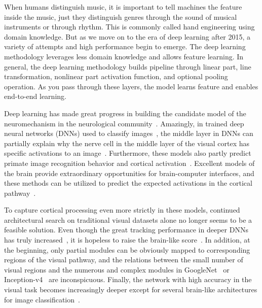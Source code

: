 \documentclass[final,3p,times,twocolumn]{elsarticle}
\begin{document}
When humans distinguish music, it is important to tell machines the feature inside the music, just they distinguish genres through the sound of musical instruments or through rhythm.
This is commonly called hand engineering using domain knowledge.
But as we move on to the era of deep learning after 2015, a variety of attempts and high performance begin to emerge.
The deep learning methodology leverages less domain knowledge and allows feature learning.
In general, the deep learning methodology builds pipeline through linear part, line transformation, nonlinear part activation function, and optional pooling operation.
As you pass through these layers, the model learns feature and enables end-to-end learning.


Deep learning has made great progress in building the candidate model of the neuromechanism in the neurological community~\cite{kubilius2019brain-like}. 
Amazingly, in trained deep neural networks (DNNs) used to classify images~\cite{Deng2009ImageNet}, the middle layer in DNNs can partially explain why the nerve cell in the middle layer of the visual cortex has specific activations to an image~\cite{yamins2014performance,khaligh2014deep,gucclu2015deep,murugesan2017brain,cichy2016deep,yamins2016using}. 
Furthermore, these models also partly predict primate image recognition behavior and cortical activation~\cite{rajalingham2018large,kubilius2016deep}.
Excellent models of the brain provide extraordinary opportunities for brain-computer interfaces,
and these methods can be utilized to predict the expected activations in the cortical pathway~\cite{bashivan2019neural}.


To capture cortical processing even more strictly in these models, continued architectural search on traditional visual datasets alone no longer seems to be a feasible solution. 
Even though the great tracking performance in deeper DNNs has truly increased~\cite{ILSVRC15,luo2021trajectory}, it is hopeless to raise the brain-like score~\cite{rajalingham2018large,su2020incremental}. 
In addition, at the beginning, only partial modules can be obviously mapped to corresponding regions of the visual pathway, 
and the relations between the small number of visual regions and the numerous and complex modules in GoogleNet~\cite{szegedy2015going} or Inception-v4~\cite{szegedy2017inception} are inconspicuous. 
Finally, the network with high accuracy in the visual task becomes increasingly deeper except for several brain-like architectures for image classification~\cite{TangSchrimpfLotter2018Recurrent, kar2019evidence}. 
\end{document}
